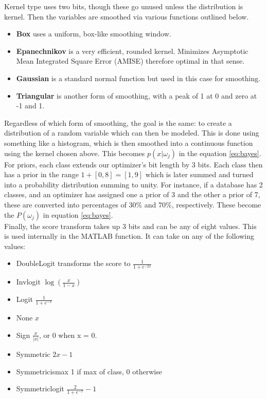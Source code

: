Kernel type uses two bits, though these go unused unless the distribution is
kernel.  Then the variables are smoothed via various functions outlined below.
\begin{itemize}
	\item \textbf{Box} uses a uniform, box-like smoothing window.
	\item \textbf{Epanechnikov} is a very efficient, rounded kernel.  Minimizes
	Asymptotic Mean Integrated Square Error (AMISE)\citep{stefanie_scheid_introduction_2004} therefore optimal
	in that sense.
	\item \textbf{Gaussian} is a standard normal function but used in this case for
	smoothing.
	\item \textbf{Triangular} is another form of smoothing, with a peak of 1 at 0
	and zero at -1 and 1.
\end{itemize}
Regardless of which form of smoothing, the goal is the same:  to create a
distribution of a random variable which can then be modeled.  This is done using
something like a histogram, which is then smoothed into a continuous function
using the kernel chosen above.  This becomes $p(x|\omega_j)$ in the equation
\ref{eq:bayes}.\\
For priors, each class extends our optimizer's bit length by 3 bits.  Each class
then has a prior in the range  $1 + [0,8]= [1,9]$ which is later summed and turned into a
probability distribution summing to unity.  For instance, if a database has 2 classes, and an optimizer has assigned one a prior of 3 and the other a prior of 7, these are converted
into percentages of 30\% and 70\%, respectively.  These become the $P(\omega_j)$ in equation \ref{eq:bayes}.\\
Finally, the score transform takes up 3 bits and can be any of eight values. 
This is used internally in the MATLAB function.  It can take on any of the following
values:
\begin{itemize}
	\item DoubleLogit transforms the score to $\frac{1}{1+e^{-2x}}$
	\item Invlogit $\log(\frac{x}{1-x})$
	\item Logit $\frac{1}{1+e^{-x}}$
	\item None $x$
	\item Sign $\frac{x}{|x|}$, or 0 when x = 0.
	\item Symmetric $2x-1$
	\item Symmetricismax 1 if max of class, 0 otherwise
	\item Symmetriclogit $\frac{2}{1+e^{-x}}-1$
\end{itemize}
